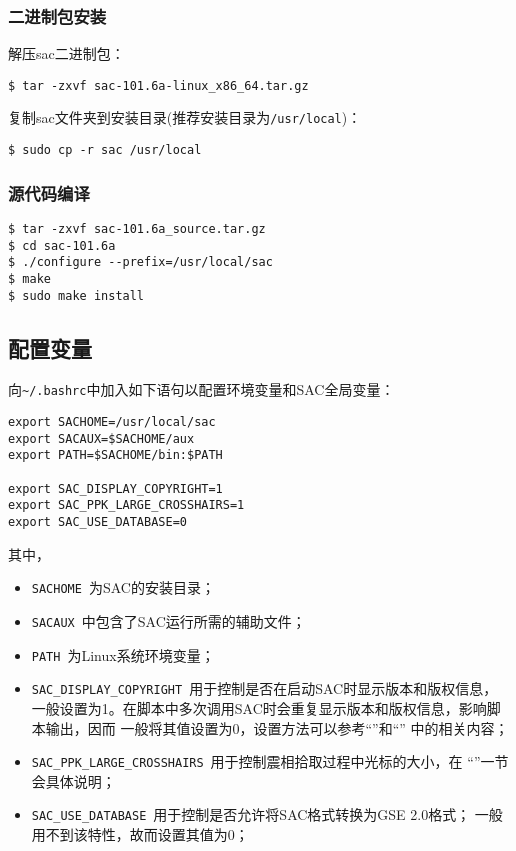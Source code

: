\subsubsection*{二进制包安装}
解压sac二进制包：
\begin{lstlisting}[style=Shell]
$ tar -zxvf sac-101.6a-linux_x86_64.tar.gz
\end{lstlisting}

复制sac文件夹到安装目录(推荐安装目录为\lstinline{/usr/local})：
\begin{lstlisting}[style=Shell]
$ sudo cp -r sac /usr/local
\end{lstlisting}

\subsubsection*{源代码编译}
\begin{lstlisting}[style=Shell]
$ tar -zxvf sac-101.6a_source.tar.gz
$ cd sac-101.6a
$ ./configure --prefix=/usr/local/sac
$ make
$ sudo make install
\end{lstlisting}

\subsection*{配置变量}
向\lstinline{~/.bashrc}中加入如下语句以配置环境变量和SAC全局变量：
\begin{lstlisting}[style=Bash]
export SACHOME=/usr/local/sac
export SACAUX=$SACHOME/aux
export PATH=$SACHOME/bin:$PATH

export SAC_DISPLAY_COPYRIGHT=1                                                   
export SAC_PPK_LARGE_CROSSHAIRS=1
export SAC_USE_DATABASE=0                                                        
\end{lstlisting}

其中，
\begin{itemize}
\item \lstinline{SACHOME}~为SAC的安装目录；
\item \lstinline{SACAUX}~中包含了SAC运行所需的辅助文件；
\item \lstinline{PATH}~为Linux系统环境变量；
\item \lstinline{SAC_DISPLAY_COPYRIGHT}~用于控制是否在启动SAC时显示版本和版权信息，
    一般设置为1。在脚本中多次调用SAC时会重复显示版本和版权信息，影响脚本输出，因而
    一般将其值设置为0，设置方法可以参考``''和``''
    中的相关内容；
\item \lstinline{SAC_PPK_LARGE_CROSSHAIRS}~用于控制震相拾取过程中光标的大小，在
    ``''一节会具体说明；
\item \lstinline{SAC_USE_DATABASE}~用于控制是否允许将SAC格式转换为GSE 2.0格式；
    一般用不到该特性，故而设置其值为0；
\end{itemize}


